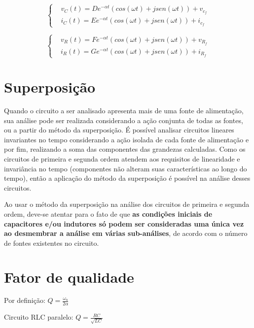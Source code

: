 \documentclass[12pt,fleqn]{book} %
\begin{document}
{\begin{equation}
\left\{\begin{aligned} & 
        v_C(t) = De^{-\alpha t}( cos(\omega t) + jsen(\omega t)) + v_{c_f}\\&       
        i_C(t) = Ee^{-\alpha t}( cos(\omega t) + jsen(\omega t)) + i_{c_f}
    \end{aligned}\right.
\end{equation}

\begin{equation}
\left\{\begin{aligned} & 
        v_R(t) = Fe^{-\alpha t}( cos(\omega t) + jsen(\omega t)) + v_{R_f}\\&       
        i_R(t) = Ge^{-\alpha t}( cos(\omega t) + jsen(\omega t)) + i_{R_f}
    \end{aligned}\right.
\end{equation}
    
    \section{Superposição}
    
    Quando o circuito a ser analisado apresenta mais de uma fonte de alimentação, sua análise pode ser realizada considerando a ação conjunta de todas as fontes, ou a partir do método da superposição. É possível analisar circuitos lineares invariantes no tempo considerando a ação isolada de cada fonte de alimentação e por fim, realizando a soma das componentes das grandezas calculadas. Como os circuitos de primeira e segunda ordem atendem aos requisitos de linearidade e invariância no tempo (componentes não alteram suas características ao longo do tempo), então a aplicação do método da superposição é possível na análise desses circuitos.

Ao usar o método da superposição na análise dos circuitos de primeira e segunda ordem, deve-se atentar para o fato de que \textbf{as condições iniciais de capacitores e/ou indutores só podem ser consideradas uma única vez ao desmembrar a análise em várias sub-análises}, de acordo com o número de fontes existentes no circuito.
        
    
    \section{Fator de qualidade}
    
Por definição: $Q=\frac{\omega_n}{2\alpha}$

Circuito RLC paralelo: $Q=\frac{RC}{\sqrt{LC}}$

}
\end{document}

